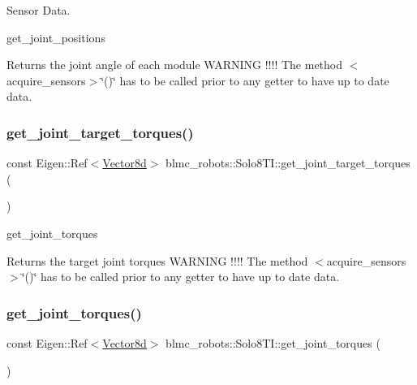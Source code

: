 Sensor Data. 

get\+\_\+joint\+\_\+positions \begin{DoxyReturn}{Returns}
the joint angle of each module W\+A\+R\+N\+I\+NG !!!! The method $<$acquire\+\_\+sensors$>$\char`\"{}()\char`\"{} has to be called prior to any getter to have up to date data. 
\end{DoxyReturn}
\mbox{\label{classblmc__robots_1_1Solo8TI_a3ed929d26586ef0aa35c4952e8c61f6d}} 
\subsubsection{\texorpdfstring{get\+\_\+joint\+\_\+target\+\_\+torques()}{get\_joint\_target\_torques()}}
{\footnotesize\ttfamily const Eigen\+::\+Ref$<$\hyperlink{common__header_8hpp_a98975ffbe0bca1296078e0350dfedd60}{Vector8d}$>$ blmc\+\_\+robots\+::\+Solo8\+T\+I\+::get\+\_\+joint\+\_\+target\+\_\+torques (\begin{DoxyParamCaption}{ }\end{DoxyParamCaption})\hspace{0.3cm}{\ttfamily [inline]}}



get\+\_\+joint\+\_\+torques 

\begin{DoxyReturn}{Returns}
the target joint torques W\+A\+R\+N\+I\+NG !!!! The method $<$acquire\+\_\+sensors$>$\char`\"{}()\char`\"{} has to be called prior to any getter to have up to date data. 
\end{DoxyReturn}
\mbox{\label{classblmc__robots_1_1Solo8TI_a79339925d2ad19cf8efff3af728a766f}} 
\subsubsection{\texorpdfstring{get\+\_\+joint\+\_\+torques()}{get\_joint\_torques()}}
{\footnotesize\ttfamily const Eigen\+::\+Ref$<$\hyperlink{common__header_8hpp_a98975ffbe0bca1296078e0350dfedd60}{Vector8d}$>$ blmc\+\_\+robots\+::\+Solo8\+T\+I\+::get\+\_\+joint\+\_\+torques (\begin{DoxyParamCaption}{ }\end{DoxyParamCaption})\hspace{0.3cm}{\ttfamily [inline]}}



